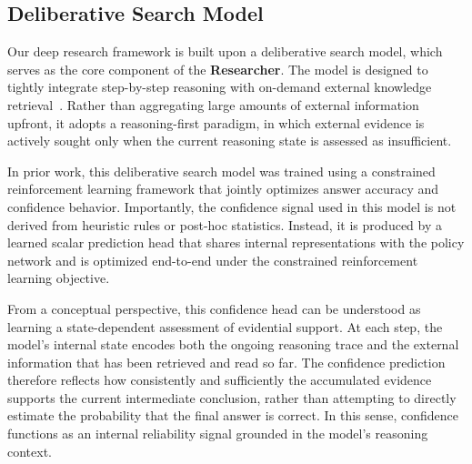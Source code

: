 \documentclass[11pt]{article}
\begin{document}
\subsection{Deliberative Search Model}

Our deep research framework is built upon a deliberative search model, which serves as the core component of the \textbf{Researcher}. The model is designed to tightly integrate step-by-step reasoning with on-demand external knowledge retrieval~\cite{lab2025safework}. Rather than aggregating large amounts of external information upfront, it adopts a reasoning-first paradigm, in which external evidence is actively sought only when the current reasoning state is assessed as insufficient.

In prior work, this deliberative search model was trained using a constrained reinforcement learning framework that jointly optimizes answer accuracy and confidence behavior. Importantly, the confidence signal used in this model is not derived from heuristic rules or post-hoc statistics. Instead, it is produced by a learned scalar prediction head that shares internal representations with the policy network and is optimized end-to-end under the constrained reinforcement learning objective.

From a conceptual perspective, this confidence head can be understood as learning a state-dependent assessment of evidential support. At each step, the model’s internal state encodes both the ongoing reasoning trace and the external information that has been retrieved and read so far. The confidence prediction therefore reflects how consistently and sufficiently the accumulated evidence supports the current intermediate conclusion, rather than attempting to directly estimate the probability that the final answer is correct. In this sense, confidence functions as an internal reliability signal grounded in the model’s reasoning context.
\end{document}
